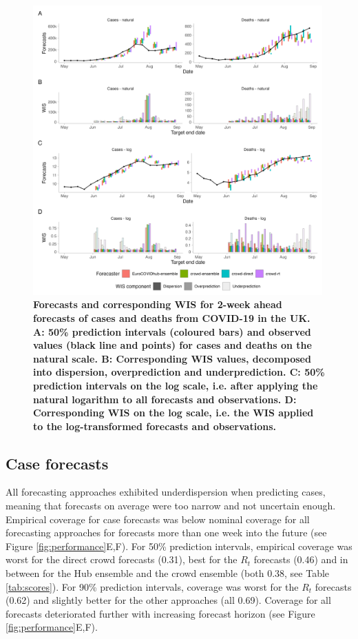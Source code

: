 \documentclass[10pt,a4paper,twocolumn]{article}
\begin{document}
\begin{figure}
\centering
\includegraphics[width=0.99\textwidth]{../output/figures/scores-and-forecasts.png}
\caption{\bf{Forecasts and corresponding WIS for 2-week ahead forecasts of cases and deaths from COVID-19 in the UK.} A: 50\% prediction intervals (coloured bars) and observed values (black line and points) for cases and deaths on the natural scale. B: Corresponding WIS values, decomposed into dispersion, overprediction and underprediction. C: 50\% prediction intervals on the log scale, i.e. after applying the natural logarithm to all forecasts and observations. D: Corresponding WIS on the log scale, i.e. the WIS applied to the log-transformed forecasts and observations.} 
\label{fig:forecasts-scores} 
\end{figure}

\subsection*{Case forecasts}

All forecasting approaches exhibited underdispersion when predicting cases, meaning that forecasts on average were too narrow and not uncertain enough. Empirical coverage for case forecasts was below nominal coverage for all forecasting approaches for forecasts more than one week into the future (see Figure \ref{fig:performance}E,F). 
For 50\% prediction intervals, empirical coverage was worst for the direct crowd forecasts (0.31), best for the $R_t$ forecasts (0.46) and in between for the Hub ensemble and the crowd ensemble (both 0.38, see Table \ref{tab:scores}). For 90\% prediction intervals, coverage was worst for the $R_t$ forecasts (0.62) and slightly better for the other approaches (all 0.69). Coverage for all forecasts deteriorated further with increasing forecast horizon (see Figure \ref{fig:performance}E,F). 
\end{document}
